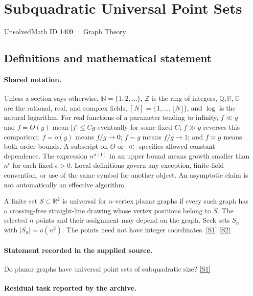 \documentclass[11pt,a4paper]{article}
\newcommand{\N}{\mathbb{N}}
\newcommand{\Z}{\mathbb{Z}}
\newcommand{\Q}{\mathbb{Q}}
\newcommand{\R}{\mathbb{R}}
\newcommand{\C}{\mathbb{C}}
\newcommand{\sref}[2]{\hyperlink{source:#1:#2}{[S#2]}}
\begin{document}

\setcounter{section}{1408}

\section{Subquadratic Universal Point Sets}\label{1409}

{\small\sffamily UnsolvedMath ID 1409 · Graph Theory}

\subsection{Definitions and mathematical statement}

\paragraph{Shared notation.}Unless a section says otherwise, $\N=\{1,2,\ldots\}$,
$\Z$ is the ring of integers, $\Q,\R,\C$ are the rational, real, and complex
fields, $[N]=\{1,\ldots,\lfloor N\rfloor\}$, and $\log$ is the natural
logarithm. For real functions of a parameter tending to infinity,
$f\ll g$ and $f=O(g)$ mean $|f|\leq Cg$ eventually for some fixed $C$;
$f\gg g$ reverses this comparison; $f=o(g)$ means $f/g\to0$;
$f\sim g$ means $f/g\to1$; and $f\asymp g$ means both order bounds.
A subscript on $O$ or $\ll$ specifies allowed constant dependence.
The expression $n^{o(1)}$ in an upper bound means growth smaller than
$n^\epsilon$ for each fixed $\epsilon>0$. Local definitions govern any
exception, finite-field convention, or use of the same symbol for another
object. An asymptotic claim is not automatically an effective algorithm.



A finite set $S\subset\R^2$ is universal for $n$-vertex planar graphs if every such graph has a crossing-free straight-line drawing whose vertex positions belong to $S$. The selected $n$ points and their assignment may depend on the graph. Seek sets $S_n$ with $|S_n|=o(n^2)$. The points need not have integer coordinates. \sref{1409}{1} \sref{1409}{2}

\paragraph{Statement recorded in the supplied source.}
Do planar graphs have universal point sets of subquadratic size? \sref{1409}{1}

\paragraph{Residual task reported by the archive.}
\end{document}
